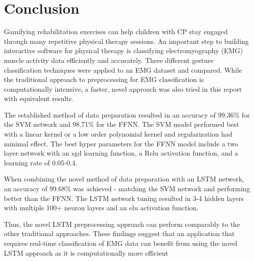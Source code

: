 \documentclass[journal]{IEEEtran}
\begin{document}
	\section{Conclusion}
	\label{sec:conclusion}
	Gamifying rehabilitation exercises can help children with CP stay engaged through many repetitive physical therapy sessions. An important step to building interactive software for physical therapy is classifying electromyography (EMG) muscle activity data efficiently and accurately. Three different gesture classification techniques were applied to an EMG dataset and compared. While the traditional approach to preprocessing for EMG classification is computationally intensive, a faster, novel approach was also tried in this report with equivalent results. 
	
	The established method of data preparation resulted in an accuracy of 99.36\% for the SVM network and 98.71\% for the FFNN. The SVM model performed best with a linear kernel or a low order polynomial kernel and regularization had minimal effect. The best hyper parameters for the FFNN model include a two layer network with an sgd learning function, a Relu activation function, and a learning rate of 0.05-0.4. 
	
	When combining the novel method of data preparation with an LSTM network, an accuracy of 99.68\% was achieved - matching the SVM network and performing better  than the FFNN. The LSTM network tuning resulted in 3-4 hidden layers with multiple 100+ neuron layers and an elu activation function. 
	
	Thus, the novel LSTM preprocessing approach can perform comparably to the other traditional approaches. These findings suggest that an application that requires real-time classification of EMG data can benefit from using the novel LSTM approach as it is computationally more efficient
	
	
	
	
	
	
	
	
	
	
	
	
	
\end{document}
